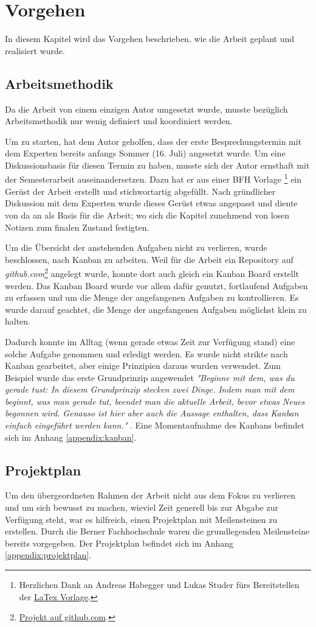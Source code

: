 \section{Vorgehen}
In diesem Kapitel wird das Vorgehen beschrieben, wie die Arbeit geplant und realisiert wurde. 

\subsection{Arbeitsmethodik}
Da die Arbeit von einem einzigen Autor umgesetzt wurde, musste bezüglich Arbeitsmethodik nur wenig definiert und koordiniert werden.

Um zu starten, hat dem Autor geholfen, dass der erste Besprechungstermin mit dem Experten bereits anfangs Sommer (16. Juli) angesetzt wurde. Um eine Diskussionsbasis für diesen Termin zu haben, musste sich der Autor ernsthaft mit der Semesterarbeit auseinandersetzen. Dazu hat er aus einer BFH Vorlage \footnote{Herzlichen Dank an Andreas Habegger und Lukas Studer fürs Bereitstellen der \href{https://gitlab.ti.bfh.ch/latex-utils/tpl_latex-thesis}{LaTex Vorlage}.} ein Gerüst der Arbeit erstellt und stichwortartig abgefüllt. Nach gründlicher Diskussion mit dem Experten wurde dieses Gerüst etwas angepasst und diente von da an als Basis für die Arbeit; wo sich die Kapitel zunehmend von losen Notizen zum finalen Zustand festigten.

Um die Übersicht der anstehenden Aufgaben nicht zu verlieren, wurde beschlossen, nach Kanban zu arbeiten. Weil für die Arbeit ein Repository auf \emph{github.com}\footnote{\href{https://github.com/bfh-semesterarbeit/spot-geoprocessing/projects/1}{Projekt auf github.com}.} angelegt wurde, konnte dort auch gleich ein Kanban Board erstellt werden. Das Kanban Board wurde vor allem dafür genutzt, fortlaufend Aufgaben zu erfassen und um die Menge der angefangenen Aufgaben zu kontrollieren. Es wurde darauf geachtet, die Menge der angefangenen Aufgaben möglichst klein zu halten.

Dadurch konnte im Alltag (wenn gerade etwas Zeit zur Verfügung stand) eine solche Aufgabe genommen und erledigt werden. Es wurde nicht strikte nach Kanban gearbeitet, aber einige Prinzipien daraus wurden verwendet. Zum Beispiel wurde das erste Grundprinzip angewendet \textit{"Beginne mit dem, was du gerade tust:
In diesem Grundprinzip stecken zwei Dinge. Indem man mit dem beginnt, was man gerade tut, beendet man die aktuelle Arbeit, bevor etwas Neues begonnen wird. Genauso ist hier aber auch die Aussage enthalten, dass Kanban einfach eingeführt werden kann."} \cite{kanban2010}. Eine Momentaufnahme des Kanbans befindet sich im Anhang \ref{appendix:kanban}.

\subsection{Projektplan}\label{chap:projektplan}
Um den übergeordneten Rahmen der Arbeit nicht aus dem Fokus zu verlieren und um sich bewusst zu machen, wieviel Zeit generell bis zur Abgabe zur Verfügung steht, war es hilfreich, einen Projektplan mit Meilensteinen zu erstellen. Durch die Berner Fachhochschule waren die grundlegenden Meilensteine bereits vorgegeben. Der Projektplan befindet sich im Anhang \ref{appendix:projektplan}.
